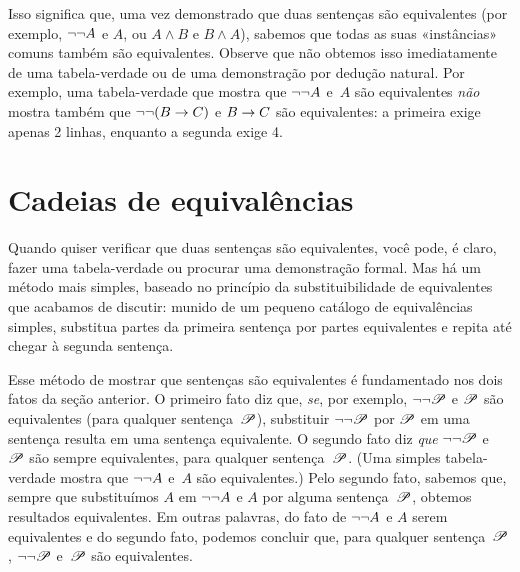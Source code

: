 
Isso significa que, uma vez demonstrado que duas sentenças são equivalentes (por exemplo, $\neg\neg A$ e $A$, ou $A \land B$ e $B \land A$), sabemos que todas as suas «instâncias» comuns também são equivalentes. Observe que não obtemos isso imediatamente de uma tabela-verdade ou de uma demonstração por dedução natural. Por exemplo, uma tabela-verdade que mostra que $\neg\neg A$ e~$A$ são equivalentes \emph{não} mostra também que $\neg\neg(B \rightarrow C)$ e $B \rightarrow C$ são equivalentes: a primeira exige apenas 2 linhas, enquanto a segunda exige 4.

\section{Cadeias de equivalências}

Quando quiser verificar que duas sentenças são equivalentes, você pode, é claro, fazer uma tabela-verdade ou procurar uma demonstração formal. Mas há um método mais simples, baseado no princípio da substituibilidade de equivalentes que acabamos de discutir: munido de um pequeno catálogo de equivalências simples, substitua partes da primeira sentença por partes equivalentes e repita até chegar à segunda sentença.

Esse método de mostrar que sentenças são equivalentes é fundamentado nos dois fatos da seção anterior. O primeiro fato diz que, \emph{se}, por exemplo, $\neg\neg \mathscr{P}$ e $\mathscr{P}$ são equivalentes (para qualquer sentença~$\mathscr{P}$), substituir $\neg\neg\mathscr{P}$ por $\mathscr{P}$ em uma sentença resulta em uma sentença equivalente. O segundo fato diz \emph{que} $\neg\neg \mathscr{P}$ e~$\mathscr{P}$ são sempre equivalentes, para qualquer sentença~$\mathscr{P}$. (Uma simples tabela-verdade mostra que $\neg\neg A$ e~$A$ são equivalentes.) Pelo segundo fato, sabemos que, sempre que substituímos $A$ em $\neg\neg A$ e $A$ por alguma sentença~$\mathscr{P}$, obtemos resultados equivalentes. Em outras palavras, do fato de $\neg\neg A$ e $A$ serem equivalentes e do segundo fato, podemos concluir que, para qualquer sentença~$\mathscr{P}$, $\neg\neg \mathscr{P}$ e~$\mathscr{P}$ são equivalentes.

